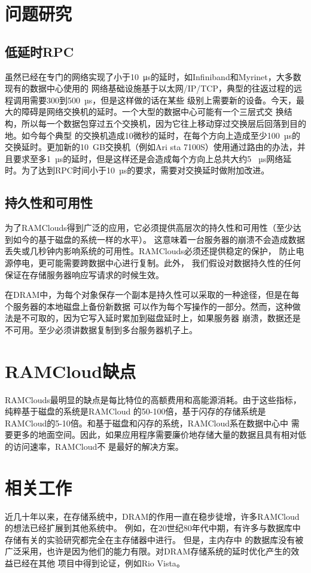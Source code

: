 \documentclass[translation]{zjutreport}
\begin{document}
\chapter{问题研究}
\section{低延时RPC}
虽然已经在专门的网络实现了小于10~μs的延时，如Infiniband和Myrinet，大多数现有的数据中心使用的
网络基础设施基于以太网/IP/TCP，典型的往返过程的远程调用需要300到500~µs，但是这样做的话在某些
级别上需要新的设备。今天，最大的障碍是网络交换机的延时。一个大型的数据中心可能有一个三层式交
换结构，所以每一个数据包穿过五个交换机，因为它往上移动穿过交换层后回落到目的地。如今每个典型
的交换机造成10微秒的延时，在每个方向上造成至少100~µs的交换延时。更加新的10~GB交换机（例如Ari
sta 7100S\cite{ref:13}）使用通过路由的办法，并且要求至多1~µs的延时，但是这样还是会造成每个方向上总共大约5
~µs网络延时。为了达到RPC时间小于10~µs的要求，需要对交换延时做附加改进。

\section{持久性和可用性}
为了RAMClouds得到广泛的应用，它必须提供高层次的持久性和可用性（至少达到如今的基于磁盘的系统一样的水平）。
这意味着一台服务器的崩溃不会造成数据丢失或几秒钟内影响系统的可用性。RAMClouds必须还提供稳定的保护，
防止电源停电，更可能需要跨数据中心进行复制。此外，
我们假设对数据持久性的任何保证在存储服务器响应写请求的时候生效。

在DRAM中，为每个对象保存一个副本是持久性可以采取的一种途径，但是在每个服务器的本地磁盘上备份新数据
可以作为每个写操作的一部分。然而，这种做法是不可取的，因为它写入延时累加到磁盘延时上，如果服务器
崩溃，数据还是不可用。至少必须讲数据复制到多台服务器机子上。

\chapter{RAMCloud缺点}
RAMClouds最明显的缺点是每比特位的高额费用和高能源消耗。由于这些指标，纯粹基于磁盘的系统\cite{ref:1}是RAMCloud
的50-100倍，基于闪存的存储系统是RAMCloud的5-10倍。和基于磁盘和闪存的系统，RAMCloud系在数据中心中
需要更多的地面空间。因此，如果应用程序需要廉价地存储大量的数据且具有相对低的访问速率，RAMCloud不
是最好的解决方案。

\chapter{相关工作}
近几十年以来，在存储系统中，DRAM的作用一直在稳步徒增，许多RAMCloud的想法已经扩展到其他系统中。
例如，在20世纪80年代中期，有许多与数据库中存储有关的实验研究都完全在主存储器中进行\cite{ref:9,ref:11}。
但是，主内存中
的数据库没有被广泛采用，也许是因为他们的能力有限。对DRAM存储系统的延时优化产生的效益已经在其他
项目中得到论证，例如Rio Vista\cite{ref:15}。
\end{document}
